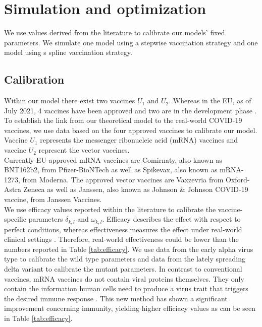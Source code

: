 \section{Simulation and optimization}
We use values derived from the literature to calibrate our models' fixed parameters. We simulate one model using a stepwise vaccination strategy and one model using s spline vaccination strategy.


\subsection{Calibration}
Within our model there  exist two vaccines $U_1$ and $U_2$. Whereas in the EU, as of July 2021, 4 vaccines have been approved and two are in the development phase \citep{ECa.2021}. To establish the link from our theoretical model to the real-world COVID-19 vaccines, we use data based on the four approved vaccines to calibrate our model. Vaccine $U_1$ represents the messenger ribonucleic acid (mRNA) vaccines and vaccine $U_2$ represent the vector vaccines. \\

Currently EU-approved mRNA vaccines are Comirnaty, also known as BNT162b2, from Pfizer-BioNTech as well as Spikevax, also known as mRNA-1273, from Moderna. The approved vector vaccines are Vaxzevria from Oxford-Astra Zeneca as well as Janssen, also known as Johnson \& Johnson COVID-19 vaccine, from Janssen Vaccines. \\
 
We use efficacy values reported within the literature to calibrate the vaccine-specific parameters $\delta_{k,l}$ and $\omega_{k,l}$. Efficacy describes the effect with respect to perfect conditions, whereas effectiveness measures the effect under real-world clinical settings \citep{Gartlehner.2006}. Therefore, real-world effectiveness could be lower than the numbers reported in Table \ref{tab:efficacy}. 
We use data from the early alpha virus type to calibrate the wild type parameters and data from the lately spreading delta variant to calibrate the mutant parameters.  In contrast to conventional vaccines, mRNA vaccines do not contain viral proteins themselves. They only contain the information human cells need to produce a virus trait that triggers the desired immune response \citep{Biontech.2021}. This new method has shown a significant improvement concerning immunity, yielding higher efficiacy values as can be seen in Table \ref{tab:efficacy}. 


